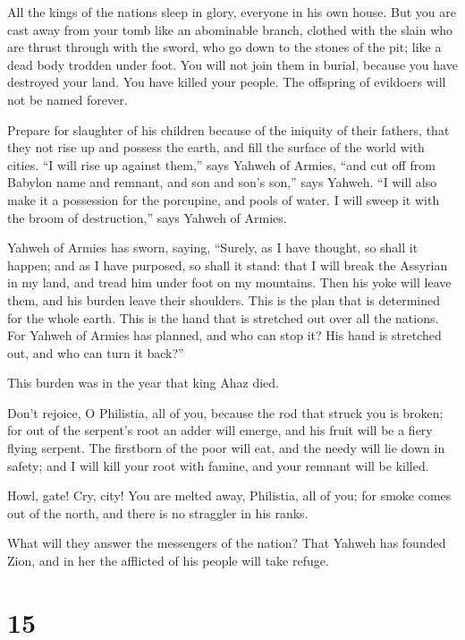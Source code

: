  All the kings of the nations sleep in glory, everyone in
his own house.  But you are cast away from your tomb like
an abominable branch, clothed with the slain who are thrust through with
the sword, who go down to the stones of the pit; like a dead body
trodden under foot.  You will not join them in burial,
because you have destroyed your land. You have killed your people. The
offspring of evildoers will not be named forever.

 Prepare for slaughter of his children because of the
iniquity of their fathers, that they not rise up and possess the earth,
and fill the surface of the world with cities.  ``I will
rise up against them,'' says Yahweh of Armies, ``and cut off from
Babylon name and remnant, and son and son's son,'' says Yahweh.
 ``I will also make it a possession for the porcupine, and
pools of water. I will sweep it with the broom of destruction,'' says
Yahweh of Armies.

 Yahweh of Armies has sworn, saying, ``Surely, as I have
thought, so shall it happen; and as I have purposed, so shall it stand:
 that I will break the Assyrian in my land, and tread him
under foot on my mountains. Then his yoke will leave them, and his
burden leave their shoulders.  This is the plan that is
determined for the whole earth. This is the hand that is stretched out
over all the nations.  For Yahweh of Armies has planned,
and who can stop it? His hand is stretched out, and who can turn it
back?''

 This burden was in the year that king Ahaz died.

 Don't rejoice, O Philistia, all of you, because the rod
that struck you is broken; for out of the serpent's root an adder will
emerge, and his fruit will be a fiery flying serpent.  The
firstborn of the poor will eat, and the needy will lie down in safety;
and I will kill your root with famine, and your remnant will be killed.

 Howl, gate! Cry, city! You are melted away, Philistia, all
of you; for smoke comes out of the north, and there is no straggler in
his ranks.

 What will they answer the messengers of the nation? That
Yahweh has founded Zion, and in her the afflicted of his people will
take refuge.

\hypertarget{section-14}{%
\section{15}\label{section-14}}

